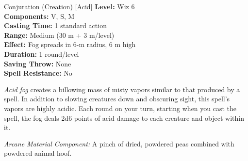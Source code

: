 {Conjuration (Creation) [Acid]}
{
	\textbf{Level:}
	Wiz 6\\
	\textbf{Components:}
	V, S, M\\
	\textbf{Casting Time:}
	1 standard action\\
	\textbf{Range:}
	Medium (30 m + 3 m/level)\\
	\textbf{Effect:}
	Fog spreads in 6-m radius, 6 m high\\
	\textbf{Duration:}
	1 round/level\\
	\textbf{Saving Throw:}
	None\\
	\textbf{Spell Resistance:}
	No\\
}
{
	\emph{Acid fog} creates a billowing mass of misty vapors similar to that produced by a  spell. In addition to slowing creatures down and obscuring sight, this spell's vapors are highly acidic. Each round on your turn, starting when you cast the spell, the fog deals 2d6 points of acid damage to each creature and object within it.

	\textit{Arcane Material Component:}
	A pinch of dried, powdered peas combined with powdered animal hoof.

}
